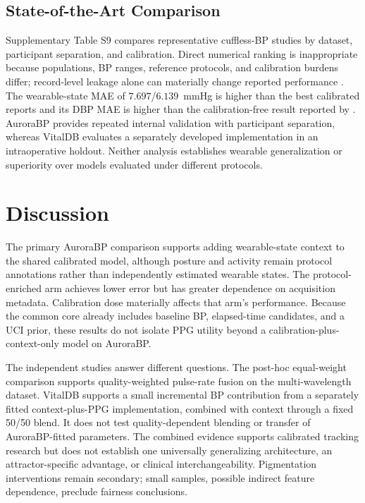 \documentclass[12pt]{article}
\let\cite\citep
\begin{document}
\subsection{State-of-the-Art Comparison}
\label{sec:sota}
Supplementary Table S9 compares representative cuffless-BP studies by dataset, participant separation, and calibration. Direct numerical ranking is inappropriate because populations, BP ranges, reference protocols, and calibration burdens differ; record-level leakage alone can materially change reported performance \cite{bpbenchmark2023}. The wearable-state MAE of $7.697$/$6.139$~mmHg is higher than the best calibrated reports and its DBP MAE is higher than the calibration-free result reported by \citet{calfree2023}. AuroraBP provides repeated internal validation with participant separation, whereas VitalDB evaluates a separately developed implementation in an intraoperative holdout. Neither analysis establishes wearable generalization or superiority over models evaluated under different protocols.
\section{Discussion}
\label{sec:discussion}
The primary AuroraBP comparison supports adding wearable-state context to the shared calibrated model, although posture and activity remain protocol annotations rather than independently estimated wearable states. The protocol-enriched arm achieves lower error but has greater dependence on acquisition metadata. Calibration dose materially affects that arm's performance. Because the common core already includes baseline BP, elapsed-time candidates, and a UCI prior, these results do not isolate PPG utility beyond a calibration-plus-context-only model on AuroraBP.

The independent studies answer different questions. The post-hoc equal-weight comparison supports quality-weighted pulse-rate fusion on the multi-wavelength dataset. VitalDB supports a small incremental BP contribution from a separately fitted context-plus-PPG implementation, combined with context through a fixed 50/50 blend. It does not test quality-dependent blending or transfer of AuroraBP-fitted parameters. The combined evidence supports calibrated tracking research but does not establish one universally generalizing architecture, an attractor-specific advantage, or clinical interchangeability. Pigmentation interventions remain secondary; small samples, possible indirect feature dependence, preclude fairness conclusions.
\end{document}

